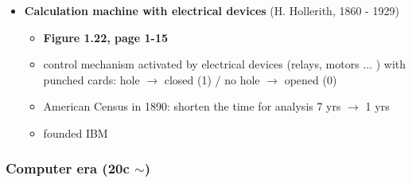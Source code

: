 \documentclass{standalone}
\begin{document}
\begin{itemize}
\begin{itemize}
		\end{itemize}
	\item \textbf{Calculation machine with electrical devices} (H. Hollerith, 1860 - 1929)
		\begin{itemize}
			\item \textbf{Figure 1.22, page 1-15}
			\item control mechanism activated by electrical devices (relays, motors ... ) with punched cards: hole $\rightarrow$ closed (1) / no hole $\rightarrow$ opened (0)
			\item American Census in 1890: shorten the time for analysis 7 yrs $\rightarrow$ 1 yrs
			\item founded IBM
		\end{itemize}
\end{itemize}

\subsubsection*{Computer era (20c $\sim$)}
\end{document}
